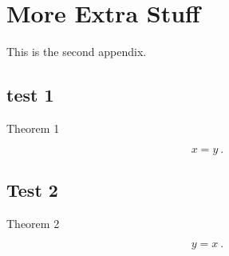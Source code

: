 \chapter{More Extra Stuff}

This is the second appendix.

\section{test 1}

\begin{theo}
  Theorem 1
\end{theo}

\begin{equation}
  x = y \ .
\end{equation}

\section{Test 2}

\begin{theo}
  Theorem 2
\end{theo}

\begin{equation}
  y = x \ .
\end{equation}



